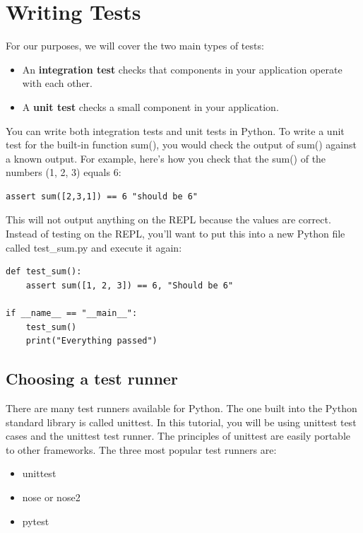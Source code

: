 \documentclass{report}
\begin{document}
    \section{Writing Tests}
    \bigbreak \noindent 
    For our purposes, we will cover the two main types of tests:
    \begin{itemize}
        \item An \textbf{integration test} checks that components in your application operate with each other.
        \item A \textbf{unit test} checks a small component in your application.
    \end{itemize}
    \bigbreak \noindent 
    You can write both integration tests and unit tests in Python. To write a unit test for the built-in function sum(), you would check the output of sum() against a known output.
    \bigbreak \noindent 
    For example, here’s how you check that the sum() of the numbers (1, 2, 3) equals 6:
    \begin{verbatim}
assert sum([2,3,1]) == 6 "should be 6"
    \end{verbatim}
    \bigbreak \noindent 
    This will not output anything on the REPL because the values are correct.
    \bigbreak \noindent 
    Instead of testing on the REPL, you’ll want to put this into a new Python file called test\_sum.py and execute it again:
    \begin{verbatim}
def test_sum():
    assert sum([1, 2, 3]) == 6, "Should be 6"

if __name__ == "__main__":
    test_sum()
    print("Everything passed")
    \end{verbatim}

    \bigbreak \noindent \bigbreak \noindent 
    \subsection{Choosing a test runner}
    \bigbreak \noindent 
    There are many test runners available for Python. The one built into the Python standard library is called unittest. In this tutorial, you will be using unittest test cases and the unittest test runner. The principles of unittest are easily portable to other frameworks. The three most popular test runners are:
    \begin{itemize}
        \item unittest
        \item nose or nose2
        \item pytest
    \end{itemize}
    
\end{document}
